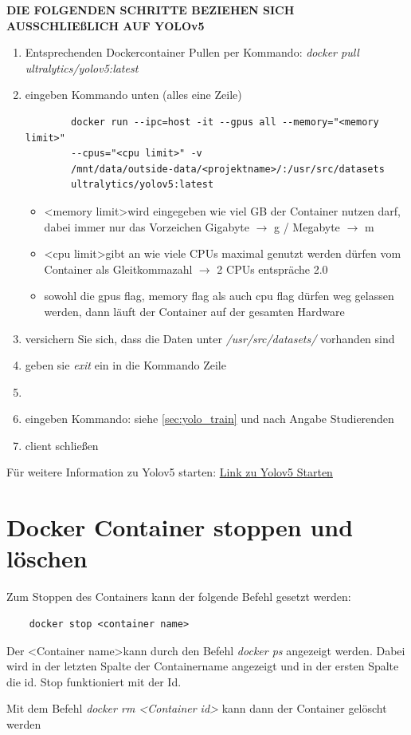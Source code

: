 \textbf{DIE FOLGENDEN SCHRITTE BEZIEHEN SICH AUSSCHLIEßLICH AUF YOLOv5}
\begin{enumerate}
    \item Entsprechenden Dockercontainer Pullen per Kommando: \textit{docker pull ultralytics/yolov5:latest} 
    \item eingeben Kommando unten (alles eine Zeile)
    \begin{verbatim}
        docker run --ipc=host -it --gpus all --memory="<memory limit>"
        --cpus="<cpu limit>" -v 
        /mnt/data/outside-data/<projektname>/:/usr/src/datasets
        ultralytics/yolov5:latest
    \end{verbatim}
    \begin{itemize}
        \item \textless memory limit\textgreater  wird eingegeben wie viel GB der Container nutzen darf, dabei immer nur das Vorzeichen Gigabyte  $\rightarrow$ g / Megabyte $\rightarrow$ m
        \item \textless cpu limit\textgreater gibt an wie viele CPUs maximal genutzt werden dürfen vom Container als Gleitkommazahl $\rightarrow$ 2 CPUs entspräche 2.0
        \item sowohl die gpus flag, memory flag als auch cpu flag dürfen weg gelassen werden, dann läuft der Container auf der gesamten Hardware    
    \end{itemize}
    \item versichern Sie sich, dass die Daten unter \textit{/usr/src/datasets/} vorhanden sind
    \item geben sie \textit{exit} ein in die Kommando Zeile 
    \item 
    \item eingeben Kommando: siehe \autoref{sec:yolo_train} und nach Angabe Studierenden
    \item client schließen

\end{enumerate}
Für weitere Information zu Yolov5 starten: \href{https://github.com/ultralytics/yolov5/wiki/Docker-Quickstart}{Link zu Yolov5 Starten} 

\section{Docker Container stoppen und löschen}
Zum Stoppen des Containers kann der folgende Befehl gesetzt werden:
\begin{verbatim}
    docker stop <container name>
\end{verbatim}
Der \textless Container name\textgreater kann durch den Befehl \textit{docker ps} angezeigt werden. Dabei wird in der letzten Spalte der Containername angezeigt und in der ersten Spalte die id. Stop funktioniert mit der Id.

Mit dem Befehl \textit{docker rm \textless Container id\textgreater} kann dann der Container gelöscht werden